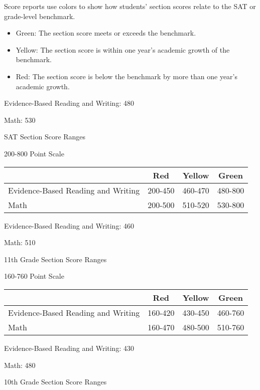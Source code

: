 
Score reports use colors to show how students’ section scores relate to the SAT or grade-level benchmark.
\begin{itemize}
\item Green: The section score meets or exceeds the benchmark.
\item Yellow: The section score is within one year’s academic growth of the benchmark.
\item Red: The section score is below the benchmark by more than one year’s academic growth.
\end{itemize}


Evidence-Based Reading and Writing: 480

Math: 530

SAT Section Score Ranges

200-800 Point Scale
 
\begin{tabular}{|l|c|c|c|}
\hline
  &
Red &
Yellow &
Green \\
\hline
Evidence-Based  
Reading and Writing &
200-450 &
460-470 &
480-800 \\
\hline
Math  &
200-500 &
510-520 &
530-800 \\
\hline
\end{tabular}


Evidence-Based Reading and Writing: 460

Math: 510

11th Grade Section Score Ranges

160-760 Point Scale

\begin{tabular}{|l|c|c|c|} 
\hline
  &
Red &
Yellow &
Green \\
\hline
Evidence-Based
Reading and Writing  &
160-420 &
430-450 &
460-760 \\
\hline
Math  &
160-470 &
480-500 &
510-760 \\
\hline
\end{tabular}




Evidence-Based Reading and Writing: 430

Math: 480

10th Grade Section Score Ranges
 
